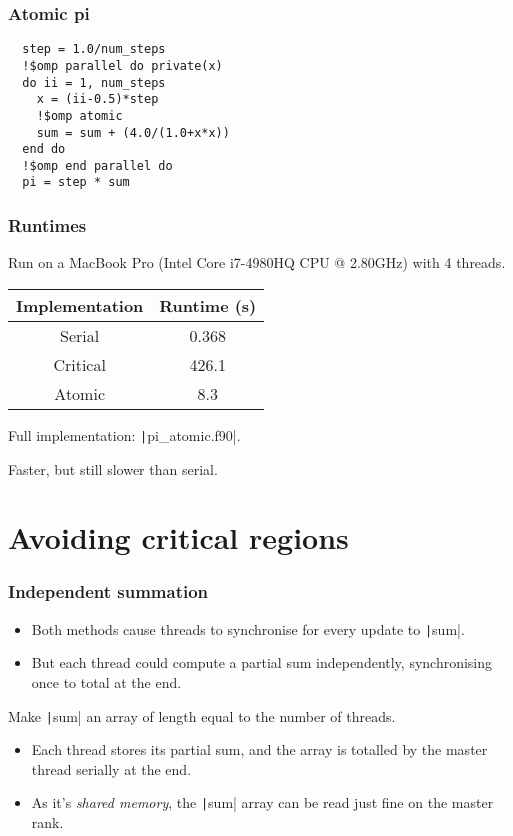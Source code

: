 \documentclass{beamer}
\begin{document}
\begin{frame}[fragile]
\frametitle{Atomic pi}
\begin{verbatim}
  step = 1.0/num_steps
  !$omp parallel do private(x)
  do ii = 1, num_steps
    x = (ii-0.5)*step
    !$omp atomic
    sum = sum + (4.0/(1.0+x*x))
  end do
  !$omp end parallel do
  pi = step * sum
\end{verbatim}
\end{frame}

\begin{frame}
\frametitle{Runtimes}
Run on a MacBook Pro (Intel Core i7-4980HQ CPU @ 2.80GHz) with 4 threads.

\vfill

\begin{table}
\begin{tabular}{cc}
\toprule
Implementation & Runtime (s) \\
\midrule
Serial   & 0.368 \\
Critical & 426.1 \\
Atomic   & 8.3 \\
\bottomrule
\end{tabular}
\end{table}

Full implementation: \texttt|pi_atomic.f90|.

\begin{center}
\large Faster, but still slower than serial.
\end{center}

\end{frame}

\section{Avoiding critical regions}
\begin{frame}
\frametitle{Independent summation}
\begin{itemize}
  \item Both methods cause threads to synchronise for every update to \texttt|sum|.
  \item But each thread could compute a partial sum independently, synchronising once to total at the end.
\end{itemize}

\vfill

Make \texttt|sum| an array of length equal to the number of threads.
\begin{itemize}
  \item Each thread stores its partial sum, and the array is totalled by the master thread serially at the end.
  \item As it's \emph{shared memory}, the \texttt|sum| array can be read just fine on the master rank.
\end{itemize}
\end{frame}
\end{document}
